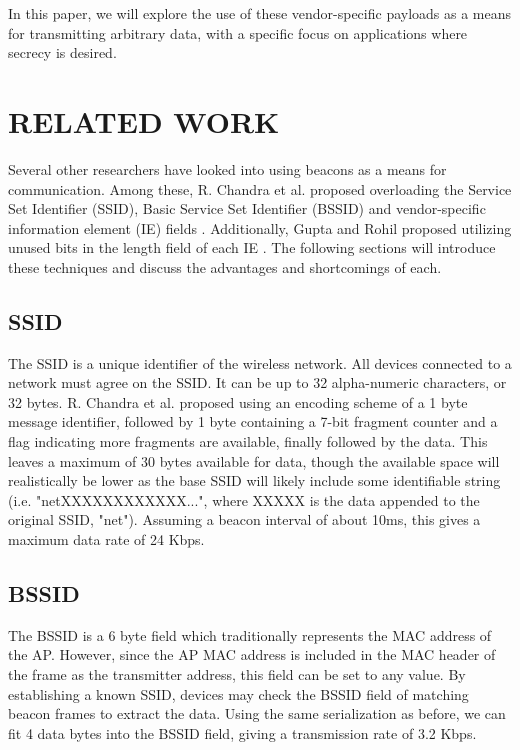 \documentclass[letterpaper, 10 pt, conference]{ieeeconf}  %
\begin{document}
In this paper, we will explore the use of these vendor-specific payloads as a means for transmitting arbitrary data, with a specific focus on applications where secrecy is desired.


\section{RELATED WORK}

Several other researchers have looked into using beacons as a means for communication. Among these, R. Chandra et al. proposed overloading the Service Set Identifier (SSID), Basic Service Set Identifier (BSSID) and vendor-specific information element (IE) fields \cite{c1}.  Additionally, Gupta and Rohil proposed utilizing unused bits in the length field of each IE \cite{c2}.  The following sections will introduce these techniques and discuss the advantages and shortcomings of each.

\subsection{SSID}
The SSID is a unique identifier of the wireless network. All devices connected to a network must agree on the SSID.  It can be up to 32 alpha-numeric characters, or 32 bytes. R. Chandra et al. proposed using an encoding scheme of a 1 byte message identifier, followed by 1 byte containing a 7-bit fragment counter and a flag indicating more fragments are available, finally followed by the data.  This leaves a maximum of 30 bytes available for data, though the available space will realistically be lower as the base SSID will likely include some identifiable string (i.e. "netXXXXXXXXXXXX...", where XXXXX is the data appended to the original SSID, "net").  Assuming a beacon interval of about 10ms, this gives a maximum data rate of 24 Kbps.

\subsection{BSSID}
The BSSID is a 6 byte field which traditionally represents the MAC address of the AP.  However, since the AP MAC address is included in the MAC header of the frame as the transmitter address, this field can be set to any value. By establishing a known SSID, devices may check the BSSID field of matching beacon frames to extract the data. Using the same serialization as before, we can fit 4 data bytes into the BSSID field, giving a transmission rate of 3.2 Kbps.
\end{document}
